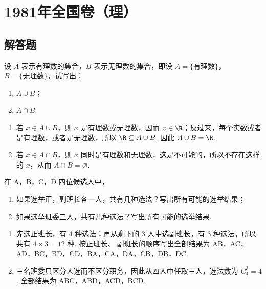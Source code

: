 \chapter{1981年全国卷（理）}

\section{解答题}

\begin{problem}
设 \(A\) 表示有理数的集合，\(B\) 表示无理数的集合，即设 \(A = \{\text{有理数}\}\)，\(B = \{\text{无理数}\}\)，试写出：

\begin{enumerate}
\item \(A \cup B\)；
\item \(A \cap B\).
\end{enumerate}
\end{problem}

\begin{solution}
\begin{enumerate}
\item 若 \(x\in A\cup B\)，则 \(x\) 是有理数或无理数，因而 \(x\in\R\)；反过来，每个实数或者是有理数，或者是无理数，所以 \(\R\subseteq A\cup B\). 因此 \(A\cup B=\R\).
\item 若 \(x\in A\cap B\)，则 \(x\) 同时是有理数和无理数，这是不可能的，所以不存在这样的 \(x\)，从而 \(A\cap B=\varnothing\).
\end{enumerate}
\end{solution}

\begin{problem}
在 A，B，C，D 四位候选人中，

\begin{enumerate}
\item 如果选举正，副班长各一人，共有几种选法？写出所有可能的选举结果；
\item 如果选举班委三人，共有几种选法？写出所有可能的选举结果.
\end{enumerate}
\end{problem}

\begin{solution}
\begin{enumerate}
\item 先选正班长，有 \(4\) 种选法；再从剩下的 \(3\) 人中选副班长，有 \(3\) 种选法，所以共有 \(4\times3=12\) 种. 按正班长、
副班长的顺序写出全部结果为 AB，AC，AD，BC，BD，CD，BA，CA，DA，CB，DB，DC.
\item 三名班委只区分人选而不区分职务，因此从四人中任取三人，选法数为 \(\mathrm C_4^3=4\). 全部结果为 ABC，ABD，ACD，BCD.
\end{enumerate}
\end{solution}

